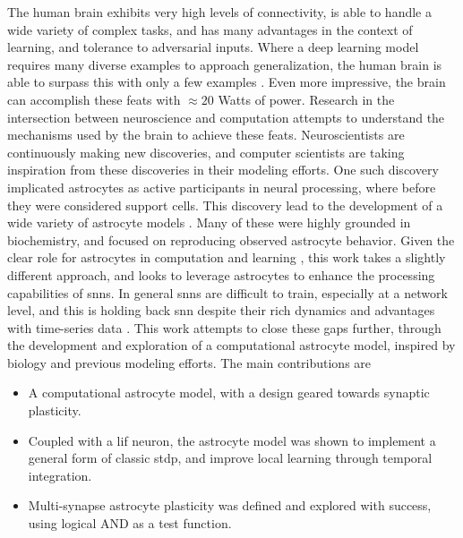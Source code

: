 \documentclass[conference]{IEEEtran}
\begin{document}

The human brain exhibits very high levels of connectivity, is able to handle a
wide variety of complex tasks, and has many advantages in the context of
learning, and tolerance to adversarial inputs. Where a deep learning model
requires many diverse examples to approach generalization, the human brain is
able to surpass this with only a few examples \parencite{tsimenidis_2020}. Even
more impressive, the brain can accomplish these feats with $\approx 20$ Watts of
power. Research in the intersection between neuroscience and computation
attempts to understand the mechanisms used by the brain to achieve these
feats. Neuroscientists are continuously making new discoveries, and computer
scientists are taking inspiration from these discoveries in their modeling
efforts. One such discovery implicated astrocytes as active participants in
neural processing, where before they were considered support cells. This
discovery lead to the development of a wide variety of astrocyte models
\cite{manninen_2019}. Many of these were highly grounded in biochemistry, and
focused on reproducing observed astrocyte behavior. Given the clear role for
astrocytes in computation and learning \parencite{mederos_2018}, this work takes
a slightly different approach, and looks to leverage astrocytes to enhance the
processing capabilities of \glspl{snn}. In general \glspl{snn} are difficult to
train, especially at a network level, and this is holding back \gls{snn} despite
their rich dynamics and advantages with time-series data
\parencite{tavanaei_2019}. This work attempts to close these gaps further,
through the development and exploration of a computational astrocyte model,
inspired by biology and previous modeling efforts. The main contributions are

\begin{itemize}
  \item A computational astrocyte model, with a design geared towards synaptic
    plasticity.
  \item Coupled with a \gls{lif} neuron, the astrocyte model was shown to
    implement a general form of classic \gls{stdp}, and improve local learning
    through temporal integration.
  \item Multi-synapse astrocyte plasticity was defined and explored with
    success, using logical AND as a test function.
\end{itemize}
\end{document}
